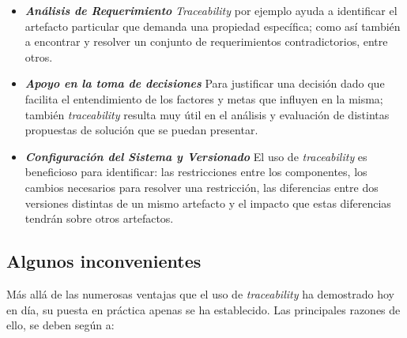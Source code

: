 \documentclass[a4paper,12pt,oneside,spanish]{book}
\begin{document}
\begin{itemize}
\item \textit{\textbf{Análisis de Requerimiento}} \textit{Traceability} por ejemplo ayuda a identificar el artefacto particular que demanda una propiedad específica; como así también a encontrar y resolver un conjunto de requerimientos contradictorios, entre otros.

\item \textit{\textbf{Apoyo en la toma de decisiones}} Para justificar una decisión dado que facilita el entendimiento de los factores y metas que influyen en la misma; también \textit{traceability} resulta muy útil en el análisis y evaluación de distintas propuestas de solución que se puedan presentar.

\item \textit{\textbf{Configuración del Sistema y Versionado}} El uso de \textit{traceability} es beneficioso para identificar: las restricciones entre los componentes, los cambios necesarios para resolver una restricción, las diferencias entre dos versiones distintas de un mismo artefacto y el impacto que estas diferencias tendrán sobre otros artefactos.

\end{itemize}


\subsection{Algunos inconvenientes}

Más allá de las numerosas ventajas que el uso de \textit{traceability} ha demostrado hoy en día, su puesta en práctica apenas se ha establecido. Las principales razones de ello, se deben según \cite{GrammelVoigt} a:
\end{document}
